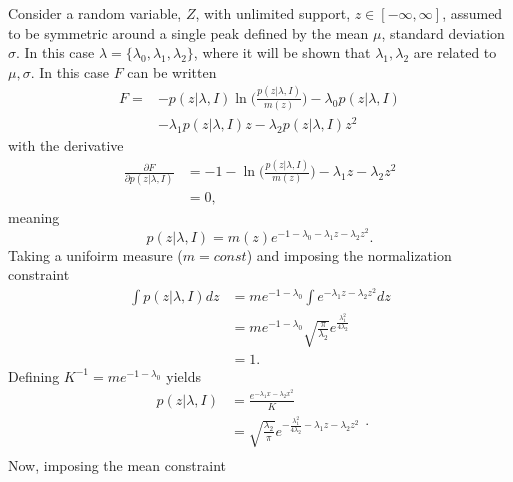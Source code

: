 \begin{example}
	Consider a random variable, $Z$, with unlimited support, $z\in [-\infty,\infty]$, assumed to be symmetric around a single peak defined by the mean $\mu$, standard deviation $\sigma$. In this case $\lambda = \{\lambda_0,\lambda_1,\lambda_2\}$, where it will be shown that $\lambda_1,\lambda_2$ are related to $\mu,\sigma$. In this case $F$ can be written\label{ex:gauss}
	\begin{equation}
		\begin{split}
			F =& -p(z|\lambda,I)\ln\bigg(\frac{p(z|\lambda,I)}{m(z)}\bigg)-\lambda_0p(z|\lambda,I)\\
			&-\lambda_1p(z|\lambda,I)z-\lambda_2p(z|\lambda,I)z^2
		\end{split}
	\end{equation}
	with the derivative
	\begin{equation}
		\begin{split}
			\frac{\partial F}{\partial p(z|\lambda,I)} &= -1-\ln\bigg(\frac{p(z|\lambda,I)}{m(z)}\bigg)-\lambda_1z-\lambda_2z^2\\
			&=0,
		\end{split}
	\end{equation}
	meaning
	\begin{equation}
		p(z|\lambda,I)=m(z)e^{-1-\lambda_0-\lambda_1z-\lambda_2z^2}.
	\end{equation}
	Taking a unifoirm measure ($m= const$) and imposing the normalization constraint
	\begin{equation}
		\begin{split}
			\int p(z|\lambda,I) dz &= me^{-1-\lambda_0}\int e^{-\lambda_1z-\lambda_2z^2}dz\\
			&= me^{-1-\lambda_0}\sqrt{\frac{\pi}{\lambda_2}}e^{\frac{\lambda_1^2}{4\lambda_2}}\\
			&=1.
		\end{split}
	\end{equation}
	Defining $K^{-1} = me^{-1-\lambda_0}$ yields
	\begin{equation}
		\begin{split}
			p(z|\lambda,I) &= \frac{e^{-\lambda_1x-\lambda_2x^2}}{K}\\
			&= \sqrt{\frac{\lambda_2}{\pi}}e^{-\frac{\lambda_1^2}{4\lambda_2}-\lambda_1z-\lambda_2z^2}\\
		\end{split}.
	\end{equation}
	Now, imposing the mean constraint

\end{example}
